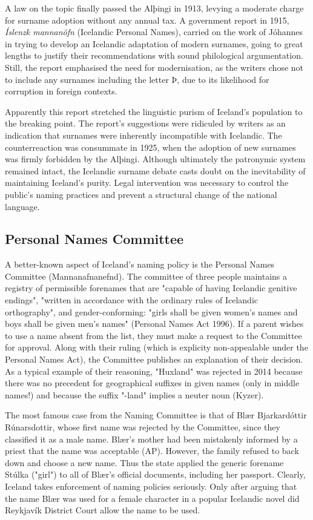 A law on the topic finally passed the Alþingi in 1913, levying a moderate
charge for surname adoption without any annual tax. A government report in
1915, \textit{Íslenzk mannanöfn} (Icelandic Personal Names), carried on the
work of Jóhannes in trying to develop an Icelandic adaptation of modern
surnames, going to great lengths to justify their recommendations with sound
philological argumentation. Still, the report emphasised the need for
modernisation, as the writers chose not to include any surnames including the
letter Þ, due to its likelihood for corruption in foreign contexts.

Apparently this report stretched the linguistic purism of Iceland's population
to the breaking point. The report's suggestions were ridiculed by writers as an
indication that surnames were inherently incompatible with Icelandic. The
counterreaction was consummate in 1925, when the adoption of new surnames was
firmly forbidden by the Alþingi. Although ultimately the patronymic system
remained intact, the Icelandic surname debate casts doubt on the inevitability
of maintaining Iceland's purity. Legal intervention was necessary to control
the public's naming practices and prevent a structural change of the national
language.

\subsection{Personal Names Committee}

A better-known aspect of Iceland's naming policy is the Personal Names
Committee (Mannanafnanefnd). The committee of three people maintains a registry
of permissible forenames that are "capable of having Icelandic genitive
endings", "written in accordance with the ordinary rules of Icelandic
orthography", and gender-conforming: "girls shall be given women's names and
boys shall be given men's names" (Personal Names Act 1996). If a parent wishes
to use a name absent from the list, they must make a request to the Committee
for approval. Along with their ruling (which is explicity non-appealable under
the Personal Names Act), the Committee publishes an explanation of their
decision. As a typical example of their reasoning, "Huxland" was rejected in
2014 because there was no precedent for geographical suffixes in given names
(only in middle names!) and because the suffix "-land" implies a neuter noun
(Kyzer).

The most famous case from the Naming Committee is that of Blær Bjarkardóttir
Rúnarsdottir, whose first name was rejected by the Committee, since they
classified it as a male name. Blær's mother had been mistakenly informed by a
priest that the name was acceptable (AP). However, the family refused to back
down and choose a new name. Thus the state applied the generic forename Stúlka
("girl") to all of Blær's official documents, including her passport. Clearly,
Iceland takes enforcement of naming policies seriously. Only after arguing that
the name Blær was used for a female character in a popular Icelandic novel did
Reykjavík District Court allow the name to be used.

